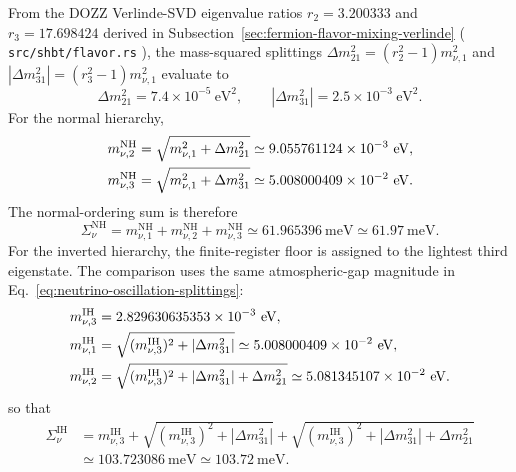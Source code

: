\documentclass[11pt,letterpaper]{article}
\theoremstyle{plain}
\DeclareRobustCommand{\pyvar}[1]{%
  \ifmmode\text{\nolinkurl{#1}}\else\nolinkurl{#1}\fi%
}
\begin{document}
From the DOZZ Verlinde-SVD eigenvalue ratios $r_2 = 3.200333$ and $r_3 = 17.698424$ derived in Subsection~\ref{sec:fermion-flavor-mixing-verlinde} (\pyvar{src/shbt/flavor.rs}), the mass-squared splittings $\Delta m_{21}^2 = (r_2^2 - 1)m_{\nu,1}^2$ and $|\Delta m_{31}^2| = (r_3^2 - 1)m_{\nu,1}^2$ evaluate to
\begin{equation}
\label{eq:neutrino-oscillation-splittings}
 \Delta m_{21}^2=7.4\times10^{-5}\ \mathrm{eV}^2,
 \qquad
 |\Delta m_{31}^2|=2.5\times10^{-3}\ \mathrm{eV}^2.
\end{equation}
For the normal hierarchy,
\begin{align}
\label{eq:normal-hierarchy-eigenstates}
 m_{\nu,2}^{\text{NH}}
 &=
 \sqrt{m_{\nu,1}^2+\Delta m_{21}^2}
 \simeq9.055761124\times10^{-3}\ \mathrm{eV},\\
 m_{\nu,3}^{\text{NH}}
 &=
 \sqrt{m_{\nu,1}^2+\Delta m_{31}^2}
 \simeq5.008000409\times10^{-2}\ \mathrm{eV}.\notag
\end{align}
The normal-ordering sum is therefore
\begin{equation}
\label{eq:normal-hierarchy-sum}
 \Sigma_{\nu}^{\text{NH}}
 =
 m_{\nu,1}^{\text{NH}}
 +m_{\nu,2}^{\text{NH}}
 +m_{\nu,3}^{\text{NH}}
 \simeq
 61.965396\ \mathrm{meV}
 \simeq61.97\ \mathrm{meV}.
\end{equation}
For the inverted hierarchy, the finite-register floor is assigned to the
lightest third eigenstate.  The comparison uses the same atmospheric-gap
magnitude in Eq.~\eqref{eq:neutrino-oscillation-splittings}:
\begin{align}
\label{eq:inverted-hierarchy-eigenstates}
 m_{\nu,3}^{\text{IH}}
 &=2.829630635353\times10^{-3}\ \mathrm{eV},\notag\\
 m_{\nu,1}^{\text{IH}}
 &=\sqrt{(m_{\nu,3}^{\text{IH}})^2+|\Delta m_{31}^2|}
 \simeq5.008000409\times10^{-2}\ \mathrm{eV},\\
 m_{\nu,2}^{\text{IH}}
 &=\sqrt{(m_{\nu,3}^{\text{IH}})^2+|\Delta m_{31}^2|+\Delta m_{21}^2}
 \simeq5.081345107\times10^{-2}\ \mathrm{eV}.\notag
\end{align}
so that
\begin{equation}
\label{eq:inverted-hierarchy-sum}
\begin{aligned}
 \Sigma_{\nu}^{\text{IH}}
 &=
 m_{\nu,3}^{\text{IH}}
 +
 \sqrt{(m_{\nu,3}^{\text{IH}})^2+|\Delta m_{31}^2|}
 +
 \sqrt{(m_{\nu,3}^{\text{IH}})^2+|\Delta m_{31}^2|+\Delta m_{21}^2} \\
 &\simeq
 103.723086\ \mathrm{meV}
 \simeq103.72\ \mathrm{meV}.
\end{aligned}
\end{equation}
\end{document}

